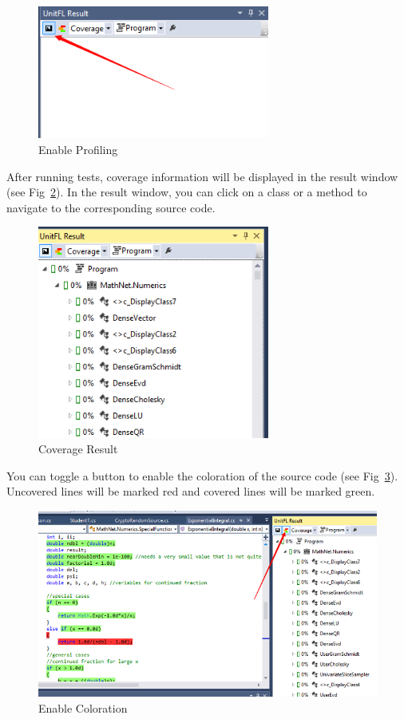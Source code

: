 \documentclass[11pt]{article} %
\begin{document}
\begin{figure}
	\centering
	\includegraphics[width=3in]{enable_profiling}
	\caption{Enable Profiling}
	\label{enable_profiling}
\end{figure}

After running tests, coverage information will be displayed in the result window (see Fig~\ref{coverage_result}). In the result window, you can click on a 
class or a method to navigate to the corresponding source code.

\begin{figure}
	\centering
	\includegraphics[width=3in]{coverage_result}
	\caption{Coverage Result}
	\label{coverage_result}
\end{figure}

You can toggle a button to enable the coloration of the source code (see Fig~\ref{enable_coloration}). Uncovered lines will be marked red and covered lines will be marked green.

\begin{figure}
	\centering
	\includegraphics[width=6in]{enable_coloration}
	\caption{Enable Coloration}
	\label{enable_coloration}
\end{figure}
\end{document}
